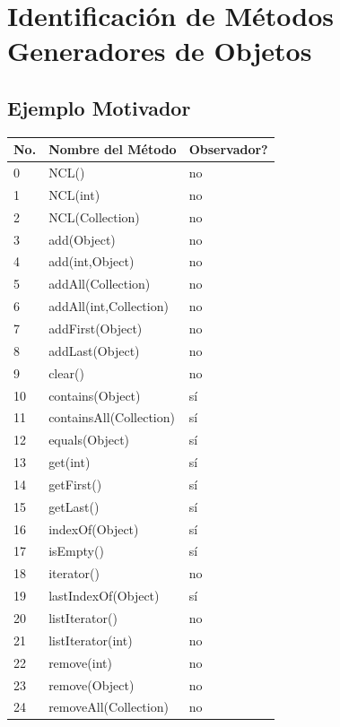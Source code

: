 \chapter[Identificación de Métodos Generadores de Objetos]{Identificación de Métodos Generadores de Objetos}
\label{cap:builders}


\section{Ejemplo Motivador}

\begin{table}[]
\centering
{\scriptsize
\begin{tabular}{|l|l|l|}
\hline
No. & Nombre del Método & Observador? \\
\hline
0 & NCL() & no \\
1 & NCL(int) & no \\
2 & NCL(Collection) & no \\
3 & add(Object) & no \\
4 & add(int,Object) & no \\
5 & addAll(Collection) & no \\
6 & addAll(int,Collection) & no \\
7 & addFirst(Object) & no \\
8 & addLast(Object) & no \\
9 & clear() & no \\
10 & contains(Object) & sí \\
11 & containsAll(Collection) & sí \\
12 & equals(Object) & sí \\
13 & get(int) & sí \\
14 & getFirst() & sí \\
15 & getLast() & sí \\
16 & indexOf(Object) & sí \\
17 & isEmpty() & sí \\
18 & iterator() & no \\
19 & lastIndexOf(Object) & sí \\
20 & listIterator() & no \\
21 & listIterator(int) & no \\
22 & remove(int) & no \\
23 & remove(Object) & no \\
24 & removeAll(Collection) & no \\

\end{tabular}}
\end{table}

